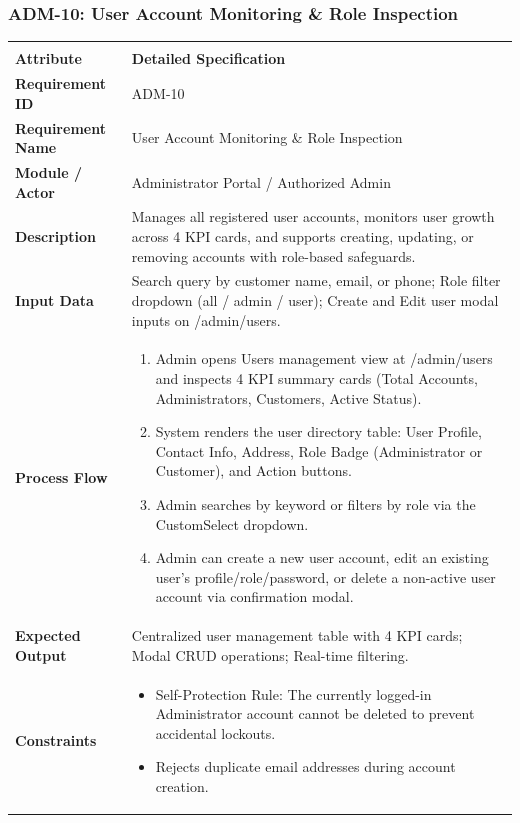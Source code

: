 \documentclass[12pt,a4paper,oneside]{report}
\begin{document}
\subsubsection{ADM-10: User Account Monitoring \& Role Inspection}
\begin{longtable}{|p{3.6cm}|p{11.9cm}|}
\hline
\rowcolor{PrimaryBrown}
\multicolumn{2}{|p{15.5cm}|}{\textbf{\textcolor{white}{Functional Specification: ADM-10 -- User Account Monitoring \& Role Inspection}}} \\
\hline
\endfirsthead
\hline
\rowcolor{PrimaryBrown}
\multicolumn{2}{|p{15.5cm}|}{\textbf{\textcolor{white}{Functional Specification: ADM-10 (Continued)}}} \\
\hline
\textbf{Attribute} & \textbf{Detailed Specification} \\
\hline
\endhead
\hline
\endfoot
\textbf{Requirement ID} & ADM-10 \\
\hline
\textbf{Requirement Name} & User Account Monitoring \& Role Inspection \\
\hline
\textbf{Module / Actor} & Administrator Portal / Authorized Admin \\
\hline
\textbf{Description} & Manages all registered user accounts, monitors user growth across 4 KPI cards, and supports creating, updating, or removing accounts with role-based safeguards. \\
\hline
\textbf{Input Data} & Search query by customer name, email, or phone; Role filter dropdown (all / admin / user); Create and Edit user modal inputs on /admin/users. \\
\hline
\textbf{Process Flow} & \begin{enumerate}[leftmargin=*,nosep,topsep=2pt]
  \item Admin opens Users management view at /admin/users and inspects 4 KPI summary cards (Total Accounts, Administrators, Customers, Active Status).
  \item System renders the user directory table: User Profile, Contact Info, Address, Role Badge (Administrator or Customer), and Action buttons.
  \item Admin searches by keyword or filters by role via the CustomSelect dropdown.
  \item Admin can create a new user account, edit an existing user's profile/role/password, or delete a non-active user account via confirmation modal.
\end{enumerate} \\
\hline
\textbf{Expected Output} & Centralized user management table with 4 KPI cards; Modal CRUD operations; Real-time filtering. \\
\hline
\textbf{Constraints} & \begin{itemize}[leftmargin=*,nosep,topsep=2pt]
  \item Self-Protection Rule: The currently logged-in Administrator account cannot be deleted to prevent accidental lockouts.
  \item Rejects duplicate email addresses during account creation.
\end{itemize} \\
\hline
\end{longtable}
\end{document}
